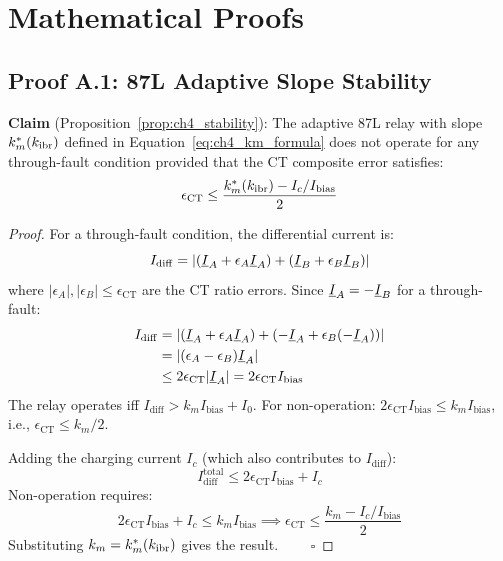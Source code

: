 \chapter{Mathematical Proofs}
\label{app:proofs}

\section{Proof A.1: 87L Adaptive Slope Stability}
\label{proof:87l_stability}

\textbf{Claim} (Proposition~\ref{prop:ch4_stability}):
The adaptive 87L relay with slope $k_m^\ast(k_{\mathrm{ibr}})$ defined in
Equation~\eqref{eq:ch4_km_formula} does not operate for any
through-fault condition provided that the CT composite error satisfies:
\[
  \epsilon_\mathrm{CT} \leq \frac{k_m^\ast(k_{\mathrm{ibr}}) - I_c/I_\mathrm{bias}}{2}
\]

\begin{proof}
For a through-fault condition, the differential current is:
\begin{equation}
  I_\mathrm{diff} = |(\underline{I}_A + \epsilon_A \underline{I}_A)
    + (\underline{I}_B + \epsilon_B \underline{I}_B)|
\end{equation}
where $|\epsilon_A|, |\epsilon_B| \leq \epsilon_\mathrm{CT}$ are the CT
ratio errors. Since $\underline{I}_A = -\underline{I}_B$ for a through-fault:
\begin{align}
  I_\mathrm{diff} &= |(\underline{I}_A + \epsilon_A \underline{I}_A)
    + (-\underline{I}_A + \epsilon_B (-\underline{I}_A))| \nonumber \\
  &= |(\epsilon_A - \epsilon_B)\underline{I}_A| \nonumber \\
  &\leq 2\epsilon_\mathrm{CT} |\underline{I}_A| = 2\epsilon_\mathrm{CT} I_\mathrm{bias}
\end{align}
The relay operates iff $I_\mathrm{diff} > k_m I_\mathrm{bias} + I_0$.
For non-operation: $2\epsilon_\mathrm{CT} I_\mathrm{bias} \leq k_m I_\mathrm{bias}$,
i.e., $\epsilon_\mathrm{CT} \leq k_m/2$.

Adding the charging current $I_c$ (which also contributes to $I_\mathrm{diff}$):
\[
  I_\mathrm{diff}^\mathrm{total} \leq 2\epsilon_\mathrm{CT} I_\mathrm{bias} + I_c
\]
Non-operation requires:
\[
  2\epsilon_\mathrm{CT} I_\mathrm{bias} + I_c \leq k_m I_\mathrm{bias}
  \implies
  \epsilon_\mathrm{CT} \leq \frac{k_m - I_c/I_\mathrm{bias}}{2}
\]
Substituting $k_m = k_m^\ast(k_{\mathrm{ibr}})$ gives the result. $\qquad\square$
\end{proof}

